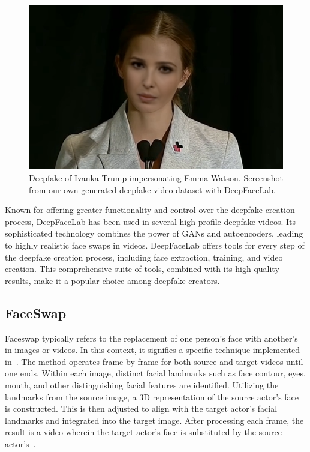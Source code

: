 \begin{figure}[htpb]
	\centering
	\includegraphics[scale=0.36]{figures/ivanka-deepfacelab}
	\caption{Deepfake of Ivanka Trump impersonating Emma Watson. Screenshot
		from our own generated deepfake video dataset with DeepFaceLab.}
\end{figure}

Known for offering greater functionality and control over the deepfake creation
process, DeepFaceLab has been used in several high-profile deepfake videos.
Its sophisticated technology combines the power of \ac{GAN}s and autoencoders,
leading to highly realistic face swaps in videos. DeepFaceLab offers tools
for every step of the deepfake creation process, including face extraction,
training, and video creation. This comprehensive suite of tools, combined
with its high-quality results, make it a popular choice among deepfake creators.

\subsection{FaceSwap}
Faceswap typically refers to the replacement of one person's face with another's
in images or videos. In this context, it signifies a specific technique
implemented in~\cite{faceswap}. The method operates frame-by-frame for both
source and target videos until one ends. Within each image, distinct
facial landmarks such as face contour, eyes, mouth, and other distinguishing
facial features are identified. Utilizing the landmarks from the source image,
a 3D representation of the source actor's face is constructed. This is then
adjusted to align with the target actor's facial landmarks and integrated
into the target image. After processing each frame, the result is a video
wherein the target actor's face is substituted by the source
actor's~\cite{deepfakes-thesis,9897972,Korshunova_2017_ICCV}.

